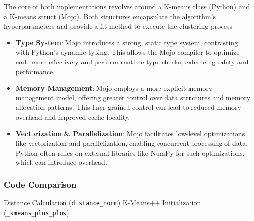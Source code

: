 \documentclass[conference]{IEEEtran}
\begin{document}
The core of both implementations revolves around a K-means class (Python) and a K-means struct (Mojo). Both structures encapsulate the algorithm's hyperparameters and provide a fit method to execute the clustering process

\begin{itemize}
    \item \textbf{Type System}: Mojo introduces a strong, static type system, contrasting with Python's dynamic typing. This allows the Mojo compiler to optimize code more effectively and perform runtime type checks, enhancing safety and performance.

    \item \textbf{Memory Management}: Mojo employs a more explicit memory management model, offering greater control over data structures and memory allocation patterns. This finer-grained control can lead to reduced memory overhead and improved cache locality.
    \item \textbf{Vectorization \& Parallelization}: Mojo facilitates low-level optimizations like vectorization and parallelization, enabling concurrent processing of data. Python often relies on external libraries like NumPy for such optimizations, which can introduce overhead.
\end{itemize}

\subsubsection{Code Comparison}

Distance Calculation (\texttt{distance\_norm}) 
K-Means++ Initialization (\texttt{\_kmeans\_plus\_plus})
\end{document}
